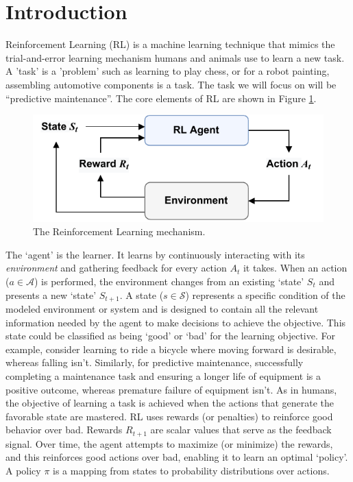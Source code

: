 \documentclass{article}
\begin{document}
	\section{Introduction}
	Reinforcement Learning (RL) is a machine learning technique that mimics the trial-and-error learning mechanism humans and animals use to learn a new task. A 'task' is a 'problem' such as learning to play chess, or for a robot painting, assembling automotive components is a task. The task we will focus on will be ``predictive maintenance''. The core elements of RL are shown in Figure \ref{fig:RL}.
	\begin{figure}[h]
		\centering
		\includegraphics[width=0.5\linewidth]{images/RL-loop.pdf}
		\caption{The Reinforcement Learning mechanism.}
		\label{fig:RL}
	\end{figure}
	
	The `agent' is the learner. It learns by continuously interacting with its \textit{environment} and gathering feedback for every action $A_t$ it takes. When an action ($a\in \mathcal{A}$) is performed, the environment changes from an existing `state' $S_t$ and presents a new `state' $S_{t+1}$. A state ($s\in \mathcal{S}$) represents a specific condition of the modeled environment or system and is designed to contain all the relevant information needed by the agent to make decisions to achieve the objective. This state could be classified as being `good' or `bad' for the learning objective. For example, consider learning to ride a bicycle where moving forward is desirable, whereas falling isn't. Similarly, for predictive maintenance, successfully completing a maintenance task and ensuring a longer life of equipment is a positive outcome, whereas premature failure of equipment isn't. As in humans, the objective of learning a task is achieved when the actions that generate the favorable state are mastered. RL uses rewards (or penalties) to reinforce good behavior over bad. Rewards $R_{t+1}$ are scalar values that serve as the feedback signal. Over time, the agent attempts to maximize (or minimize) the rewards, and this reinforces good actions over bad, enabling it to learn an optimal `policy'. A policy $\pi$ is a mapping from states to probability distributions over actions.
	
\end{document}
